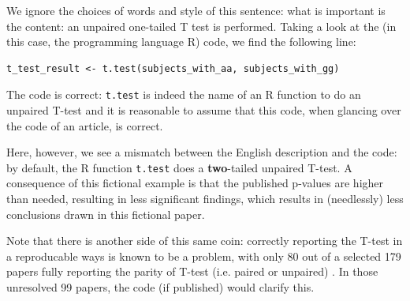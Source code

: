 We ignore the choices of words and style of this sentence: what is
important is the content: an unpaired one-tailed T test is performed.
Taking a look at the (in this case, the programming language R) code, 
we find the following line:

\begin{verbatim}
t_test_result <- t.test(subjects_with_aa, subjects_with_gg)
\end{verbatim}

The code is correct:
\verb|t.test| is indeed the name of an R function to do an unpaired T-test
and it is reasonable to assume that this code, when glancing over the code
of an article, is correct.

Here, however, we see a mismatch between the English description and the code:
by default, the R function \verb|t.test| does 
a \textbf{two}-tailed unpaired T-test.
A consequence of this fictional example is that the published p-values are
higher than needed, resulting in less significant findings, which
results in (needlessly) less conclusions drawn in this fictional paper.

Note that there is another side of this same coin:
correctly reporting the T-test in a reproducable ways
is known to be a problem, with only 80 out of a selected 179 papers
fully reporting the parity of T-test (i.e. paired or unpaired) 
\cite{weissgerber2018we}.
In those unresolved 99 papers, 
the code (if published) would clarify this.

